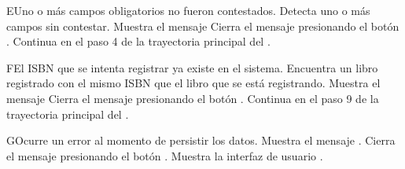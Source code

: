 \begin{UCtrayectoriaA}{E}{Uno o más campos obligatorios no fueron contestados.}
    \UCpaso Detecta uno o más campos sin contestar.
    \UCpaso Muestra el mensaje 
    \UCpaso[\UCactor] Cierra el mensaje presionando el botón .
    \UCpaso Continua en el paso 4 de la trayectoria principal del .
\end{UCtrayectoriaA}


\begin{UCtrayectoriaA}{F}{El ISBN que se intenta registrar ya existe en el sistema.}
    \UCpaso Encuentra un libro registrado con el mismo ISBN que el libro que se está registrando.
    \UCpaso Muestra el mensaje 
    \UCpaso[\UCactor] Cierra el mensaje presionando el botón .
    \UCpaso Continua en el paso 9 de la trayectoria principal del .
\end{UCtrayectoriaA}


\begin{UCtrayectoriaA}{G}{Ocurre un error al momento de persistir los datos.}
	\UCpaso Muestra el mensaje .
	\UCpaso[\UCactor] Cierra el mensaje presionando el botón .
	\UCpaso Muestra la interfaz de usuario .
\end{UCtrayectoriaA}